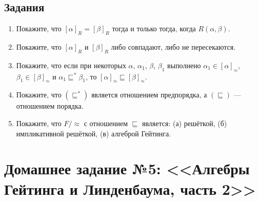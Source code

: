 \documentclass[10pt,a4paper,oneside]{article}
\begin{document}
\subsection*{Задания}

\begin{enumerate}
\item Покажите, что $[\alpha]_R=[\beta]_R$ тогда и только тогда, когда $R(\alpha,\beta)$.
\item Покажите, что $[\alpha]_R$ и $[\beta]_R$ либо совпадают, либо не пересекаются.
\item Покажите, что если при некоторых $\alpha$, $\alpha_1$, $\beta$, $\beta_1$ 
выполнено $\alpha_1\in[\alpha]_\approx$, $\beta_1\in[\beta]_\approx$ и 
$\alpha_1\sqsubseteq^*\beta_1$, то $[\alpha]_\approx\sqsubseteq[\beta]_\approx$. 
\item Покажите, что $(\sqsubseteq^*)$ является отношением предпорядка, а $(\sqsubseteq)$ --- отношением
порядка.
\item Покажите, что $F/\!\!\approx$ с отношением $\sqsubseteq$ является: (а) решёткой, (б) импликативной
решёткой, (в) алгеброй Гейтинга.
\end{enumerate}

\section*{Домашнее задание №5: <<Алгебры Гейтинга и Линденбаума, часть 2>>}
\end{document}
